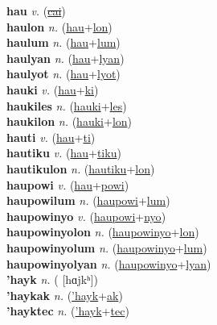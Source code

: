 \textbf{hau} \textit{v.} (\hyperref[cai]{\sout{cai}})
 \label{hau} \\
\textbf{haulon} \textit{n.} (\hyperref[hau]{hau}+\hyperref[lon]{lon})
 \label{haulon} \\
\textbf{haulum} \textit{n.} (\hyperref[hau]{hau}+\hyperref[lum]{lum})
 \label{haulum} \\
\textbf{haulyan} \textit{n.} (\hyperref[hau]{hau}+\hyperref[lyan]{lyan})
 \label{haulyan} \\
\textbf{haulyot} \textit{n.} (\hyperref[hau]{hau}+\hyperref[lyot]{lyot})
 \label{haulyot} \\
\textbf{hauki} \textit{v.} (\hyperref[hau]{hau}+\hyperref[ki]{ki})
 \label{hauki} \\
\textbf{haukiles} \textit{n.} (\hyperref[hauki]{hauki}+\hyperref[les]{les})
 \label{haukiles} \\
\textbf{haukilon} \textit{n.} (\hyperref[hauki]{hauki}+\hyperref[lon]{lon})
 \label{haukilon} \\
\textbf{hauti} \textit{v.} (\hyperref[hau]{hau}+\hyperref[ti]{ti})
 \label{hauti} \\
\textbf{hautiku} \textit{v.} (\hyperref[hau]{hau}+\hyperref[tiku]{tiku})
 \label{hautiku} \\
\textbf{hautikulon} \textit{n.} (\hyperref[hautiku]{hautiku}+\hyperref[lon]{lon})
 \label{hautikulon} \\
\textbf{haupowi} \textit{v.} (\hyperref[hau]{hau}+\hyperref[powi]{powi})
 \label{haupowi} \\
\textbf{haupowilum} \textit{n.} (\hyperref[haupowi]{haupowi}+\hyperref[lum]{lum})
 \label{haupowilum} \\
\textbf{haupowinyo} \textit{v.} (\hyperref[haupowi]{haupowi}+\hyperref[nyo]{nyo})
 \label{haupowinyo} \\
\textbf{haupowinyolon} \textit{n.} (\hyperref[haupowinyo]{haupowinyo}+\hyperref[lon]{lon})
 \label{haupowinyolon} \\
\textbf{haupowinyolum} \textit{n.} (\hyperref[haupowinyo]{haupowinyo}+\hyperref[lum]{lum})
 \label{haupowinyolum} \\
\textbf{haupowinyolyan} \textit{n.} (\hyperref[haupowinyo]{haupowinyo}+\hyperref[lyan]{lyan})
 \label{haupowinyolyan} \\
\textbf{'hayk} \textit{n.} ( [hɑjkʰ])
 \label{'hayk} \\
\textbf{'haykak} \textit{n.} (\hyperref['hayk]{'hayk}+\hyperref[ak]{ak})
 \label{'haykak} \\
\textbf{'hayktec} \textit{n.} (\hyperref['hayk]{'hayk}+\hyperref[tec]{tec})
